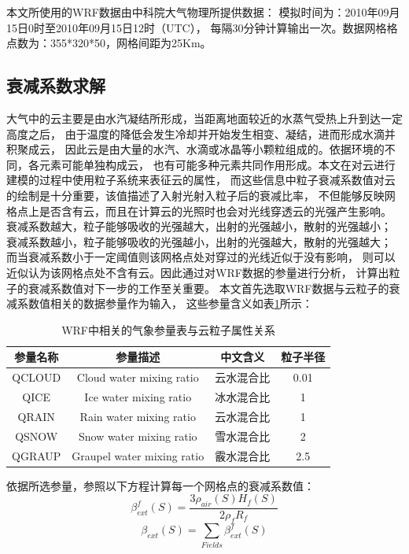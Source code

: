本文所使用的WRF数据由中科院大气物理所提供数据：
模拟时间为：2010年09月15日0时至2010年09月15日12时（UTC），
每隔30分钟计算输出一次。数据网格格点数为：355*320*50，网格间距为25Km。

\subsection{衰减系数求解}

大气中的云主要是由水汽凝结所形成，当距离地面较近的水蒸气受热上升到达一定高度之后，
由于温度的降低会发生冷却并开始发生相变、凝结，进而形成水滴并积聚成云，
因此云是由大量的水汽、水滴或冰晶等小颗粒组成的。依据环境的不同，各元素可能单独构成云，
也有可能多种元素共同作用形成。本文在对云进行建模的过程中使用粒子系统来表征云的属性，
而这些信息中粒子衰减系数值对云的绘制是十分重要，该值描述了入射光射入粒子后的衰减比率，
不但能够反映网格点上是否含有云，而且在计算云的光照时也会对光线穿透云的光强产生影响。
衰减系数越大，粒子能够吸收的光强越大，出射的光强越小，散射的光强越小；
衰减系数越小，粒子能够吸收的光强越小，出射的光强越大，散射的光强越大；
而当衰减系数小于一定阈值则该网格点处对穿过的光线近似于没有影响，
则可以近似认为该网格点处不含有云。因此通过对WRF数据的参量进行分析，
计算出粒子的衰减系数值对下一步的工作至关重要。
本文首先选取WRF数据与云粒子的衰减系数值相关的数据参量作为输入，
这些参量含义如表\ref{tab:vars_extinction_ceofficient}所示：

\begin{table}
    \centering
    \caption{WRF中相关的气象参量表与云粒子属性关系}
    \label{tab:vars_extinction_ceofficient}
    \begin{tabular}{c|c|c|c}
        \hline
        \textbf{参量名称} & \textbf{参量描述} & \textbf{中文含义}
         & \textbf{粒子半径} \\ \hline
        QCLOUD& Cloud water mixing ratio & 云水混合比 & 0.01 \\ \hline
        QICE   & Ice water mixing ratio  & 冰水混合比 & 1 \\ \hline
        QRAIN  & Rain water mixing ratio & 云水混合比 & 1 \\ \hline
        QSNOW  & Snow water mixing ratio & 雪水混合比 & 2 \\ \hline
        QGRAUP & Graupel water mixing ratio & 霰水混合比 & 2.5 \\ \hline
    \end{tabular}
\end{table}

依据所选参量，参照以下方程计算每一个网格点的衰减系数值：
\begin{equation}
\label{equ:ext_function_1}
\beta_{ext}^{f}(S)=\frac{3\rho_{air}(S)H_f(S)}{2\rho_fR_f}
\end{equation}
\begin{equation}
\label{equ:ext_function_2}
\beta_{ext}(S)=\sum_{Fields}\beta_{ext}^f(S)
\end{equation}

